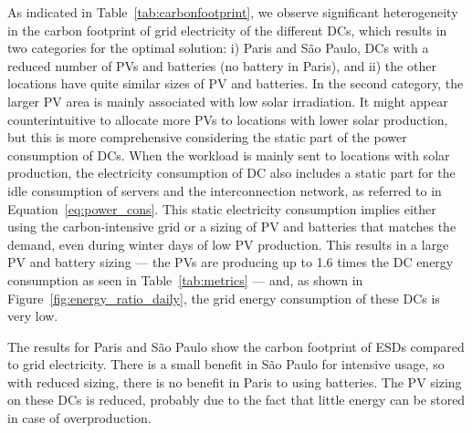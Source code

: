 As indicated in Table~\ref{tab:carbonfootprint}, we observe significant heterogeneity in the carbon footprint of grid electricity of the different DCs, %
which results in two categories for the optimal solution: i) Paris and S\~ao Paulo, DCs with a reduced number of PVs and batteries (no battery in Paris), and ii) the other locations have quite similar sizes of PV and batteries. In the second category, the larger PV area is mainly associated with low solar irradiation. It might appear counterintuitive to allocate more PVs to locations with lower solar production, but this is more comprehensive considering the static part of the power consumption of DCs. When the workload is mainly sent to locations with solar production, the electricity consumption of DC also includes a static part for the idle consumption of servers and the interconnection network, as referred to in Equation~\eqref{eq:power_cons}. This static electricity consumption implies either using the carbon-intensive grid or a sizing of PV and batteries that matches the demand, even during winter days of low PV production. This results in a large PV and battery sizing --- the PVs are producing up to 1.6 times the DC energy consumption  as seen in Table~\ref{tab:metrics} --- and, as shown in Figure~\ref{fig:energy_ratio_daily}, the grid energy consumption of these DCs is very low. 


The results for Paris and S\~ao Paulo show the carbon footprint of ESDs compared to grid electricity. There is a small benefit in S\~ao Paulo for intensive usage, so with reduced sizing, there is no benefit in Paris to using batteries. The PV sizing on these DCs is reduced, probably due to the fact that little energy can be stored in case of overproduction.

